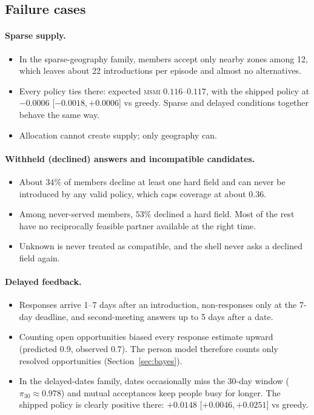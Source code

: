 \documentclass[10pt]{article}
\newcommand{\msmi}{\textsc{msmi}}
\newcommand{\ci}[2]{[$#1$,\,$#2$]}
\begin{document}
\subsection{Failure cases}\label{app:failures}

\paragraph{Sparse supply.}
\begin{itemize}
\item In the sparse-geography family, members accept only nearby zones among 12, which leaves about 22 introductions per episode and almost no alternatives.
\item Every policy ties there: expected \msmi{} $0.116$--$0.117$, with the shipped policy at $-0.0006$ \ci{-0.0018}{+0.0006} vs greedy. Sparse and delayed conditions together behave the same way.
\item Allocation cannot create supply; only geography can.
\end{itemize}

\paragraph{Withheld (declined) answers and incompatible candidates.}
\begin{itemize}
\item About $34\%$ of members decline at least one hard field and can never be introduced by any valid policy, which caps coverage at about $0.36$.
\item Among never-served members, $53\%$ declined a hard field. Most of the rest have no reciprocally feasible partner available at the right time.
\item Unknown is never treated as compatible, and the shell never asks a declined field again.
\end{itemize}

\paragraph{Delayed feedback.}
\begin{itemize}
\item Responses arrive 1--7 days after an introduction, non-responses only at the 7-day deadline, and second-meeting answers up to 5 days after a date.
\item Counting open opportunities biased every response estimate upward (predicted $0.9$, observed $0.7$). The person model therefore counts only resolved opportunities (Section~\ref{sec:bayes}).
\item In the delayed-dates family, dates occasionally miss the 30-day window ($\pi_{30}\approx0.978$) and mutual acceptances keep people busy for longer. The shipped policy is clearly positive there: $+0.0148$ \ci{+0.0046}{+0.0251} vs greedy.
\end{itemize}
\end{document}

